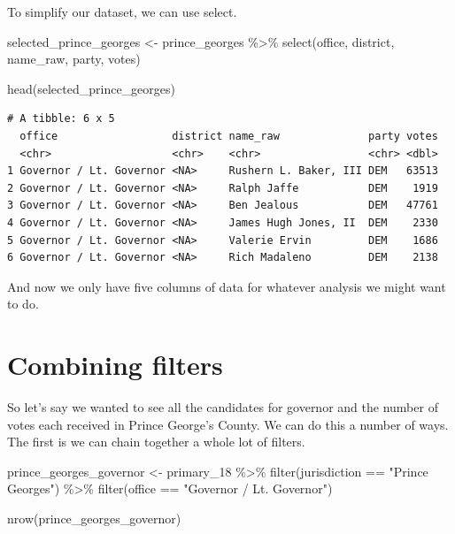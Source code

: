 \documentclass[
  letterpaper,
  DIV=11,
  numbers=noendperiod]{scrreprt}
\newenvironment{Shaded}{\begin{snugshade}}{\end{snugshade}}
\newcommand{\FunctionTok}[1]{\textcolor[rgb]{0.28,0.35,0.67}{#1}}
\newcommand{\NormalTok}[1]{\textcolor[rgb]{0.00,0.23,0.31}{#1}}
\newcommand{\OtherTok}[1]{\textcolor[rgb]{0.00,0.23,0.31}{#1}}
\newcommand{\SpecialCharTok}[1]{\textcolor[rgb]{0.37,0.37,0.37}{#1}}
\newcommand{\StringTok}[1]{\textcolor[rgb]{0.13,0.47,0.30}{#1}}
\begin{document}
To simplify our dataset, we can use select.

\begin{Shaded}
\begin{Highlighting}[]
\NormalTok{selected\_prince\_georges }\OtherTok{\textless{}{-}}\NormalTok{ prince\_georges }\SpecialCharTok{\%\textgreater{}\%} \FunctionTok{select}\NormalTok{(office, district, name\_raw, party, votes)}

\FunctionTok{head}\NormalTok{(selected\_prince\_georges)}
\end{Highlighting}
\end{Shaded}

\begin{verbatim}
# A tibble: 6 x 5
  office                  district name_raw              party votes
  <chr>                   <chr>    <chr>                 <chr> <dbl>
1 Governor / Lt. Governor <NA>     Rushern L. Baker, III DEM   63513
2 Governor / Lt. Governor <NA>     Ralph Jaffe           DEM    1919
3 Governor / Lt. Governor <NA>     Ben Jealous           DEM   47761
4 Governor / Lt. Governor <NA>     James Hugh Jones, II  DEM    2330
5 Governor / Lt. Governor <NA>     Valerie Ervin         DEM    1686
6 Governor / Lt. Governor <NA>     Rich Madaleno         DEM    2138
\end{verbatim}

And now we only have five columns of data for whatever analysis we might
want to do.

\hypertarget{combining-filters}{%
\section{Combining filters}\label{combining-filters}}

So let's say we wanted to see all the candidates for governor and the
number of votes each received in Prince George's County. We can do this
a number of ways. The first is we can chain together a whole lot of
filters.

\begin{Shaded}
\begin{Highlighting}[]
\NormalTok{prince\_georges\_governor }\OtherTok{\textless{}{-}}\NormalTok{ primary\_18 }\SpecialCharTok{\%\textgreater{}\%} \FunctionTok{filter}\NormalTok{(jurisdiction }\SpecialCharTok{==} \StringTok{"Prince George\textquotesingle{}s"}\NormalTok{) }\SpecialCharTok{\%\textgreater{}\%} \FunctionTok{filter}\NormalTok{(office }\SpecialCharTok{==} \StringTok{"Governor / Lt. Governor"}\NormalTok{)}

\FunctionTok{nrow}\NormalTok{(prince\_georges\_governor)}
\end{Highlighting}
\end{Shaded}
\end{document}
